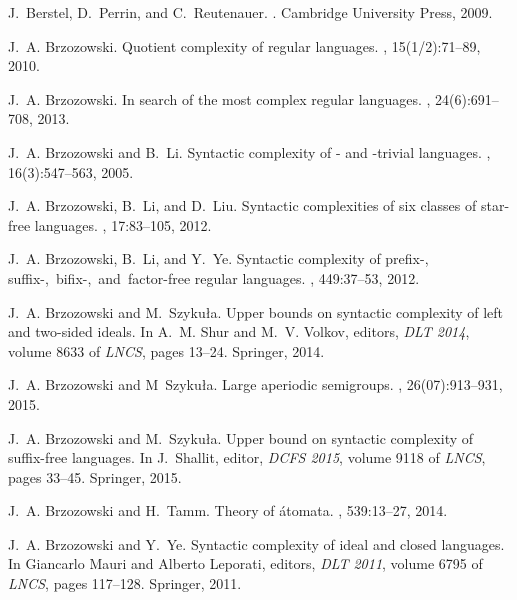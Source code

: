 \documentclass{amsart}
\begin{document}

\providecommand{\noopsort}[1]{}
\begin{thebibliography}{10}

J.~Berstel, D.~Perrin, and C.~Reutenauer.
.
\newblock Cambridge University Press, 2009.

J.~A. Brzozowski.
\newblock Quotient complexity of regular languages.
, 15(1/2):71--89, 2010.

J.~A. Brzozowski.
\newblock In search of the most complex regular languages.
, 24(6):691--708, 2013.

J.~A. Brzozowski and B.~Li.
\newblock Syntactic complexity of \mbox{}- and \mbox{}-trivial languages.
, 16(3):547--563, 2005.

J.~A. Brzozowski, B.~Li, and D.~Liu.
\newblock Syntactic complexities of six classes of star-free languages.
, 17:83--105, 2012.

J.~A. Brzozowski, B.~Li, and Y.~Ye.
\newblock Syntactic complexity of \mbox{prefix-,} \mbox{{suffix-,}
  \mbox{bifix-,} and factor-free} regular languages.
, 449:37--53, 2012.

J.~A. Brzozowski and M.~Szyku{\l}a.
\newblock Upper bounds on syntactic complexity of left and two-sided ideals.
\newblock In A.~M. Shur and M.~V. Volkov, editors, {\em DLT 2014}, volume 8633
  of {\em LNCS}, pages 13--24. Springer, 2014.

J.~A. Brzozowski and M~Szyku{\l}a.
\newblock Large aperiodic semigroups.
,
  26(07):913--931, 2015.

J.~A. Brzozowski and M.~Szyku{\l}a.
\newblock Upper bound on syntactic complexity of suffix-free languages.
\newblock In J.~Shallit, editor, {\em DCFS 2015}, volume 9118 of {\em LNCS},
  pages 33--45. Springer, 2015.

J.~A. Brzozowski and H.~Tamm.
\newblock Theory of \'atomata.
, 539:13--27, 2014.

J.~A. Brzozowski and Y.~Ye.
\newblock Syntactic complexity of ideal and closed languages.
\newblock In Giancarlo Mauri and Alberto Leporati, editors, {\em DLT 2011},
  volume 6795 of {\em LNCS}, pages 117--128. Springer, 2011.


\end{thebibliography}
\end{document}

